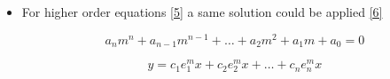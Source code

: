 \documentclass[12pt]{article}
\begin{document}
\begin{itemize}
  \item For higher order equations \eqref{5} a same solution could be applied \eqref{6}

    \begin{equation}
      a_nm^n+a_{n-1}m^{n-1}+\dots+a_2m^2+a_1m+a_0=0
      \label{5}
    \end{equation}

    \begin{equation}
      y=c_1e^m_1x+c_2e^m_2x+\dots+c_ne^m_nx
      \label{6}
    \end{equation}



\end{itemize}
\end{document}
